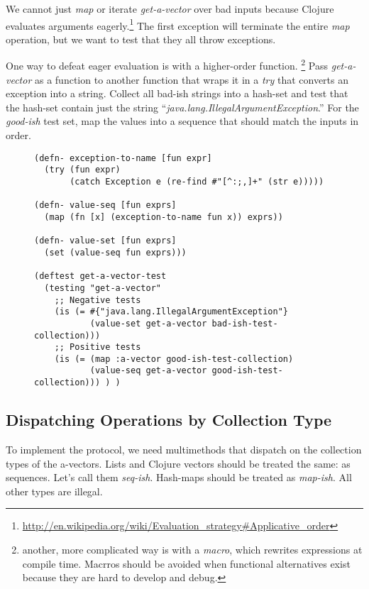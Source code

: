 \documentclass[11pt]{article}
\begin{document}
We cannot just \emph{map} or iterate \emph{get-a-vector} over bad inputs
because Clojure evaluates arguments
eagerly.\footnote{\url{http://en.wikipedia.org/wiki/Evaluation_strategy#Applicative_order}}
The first exception will terminate the entire \emph{map} operation, but we
want to test that they all throw exceptions.

One way to defeat eager evaluation is with a higher-order function.
\footnote{another, more complicated way is with a \emph{macro}, which rewrites
   expressions at compile time. Macrros should be avoided when
   functional alternatives exist because they are hard to develop and
   debug.}  Pass \emph{get-a-vector} as a function to another function that
wraps it in a \emph{try} that converts an exception into a string.
Collect all bad-ish strings into a hash-set and test that the
hash-set contain just the string
``\emph{java.lang.IllegalArgumentException}.'' For the \emph{good-ish}
test set, map the values into a sequence that should match the inputs
in order.

\begin{figure}[H]
\label{get-a-vector-test}
\begin{verbatim}
(defn- exception-to-name [fun expr]
  (try (fun expr)
       (catch Exception e (re-find #"[^:;,]+" (str e)))))

(defn- value-seq [fun exprs]
  (map (fn [x] (exception-to-name fun x)) exprs))

(defn- value-set [fun exprs]
  (set (value-seq fun exprs)))

(deftest get-a-vector-test
  (testing "get-a-vector"
    ;; Negative tests
    (is (= #{"java.lang.IllegalArgumentException"}
           (value-set get-a-vector bad-ish-test-collection)))
    ;; Positive tests
    (is (= (map :a-vector good-ish-test-collection)
           (value-seq get-a-vector good-ish-test-collection))) ) )
\end{verbatim}
\end{figure}
\subsection{Dispatching Operations by Collection Type}
\label{sec-4-5}

To implement the protocol, we need multimethods that dispatch on the
collection types of the a-vectors. Lists and Clojure vectors should
be treated the same: as sequences. Let's call them
\emph{seq-ish}. Hash-maps should be treated as \emph{map-ish}. All other types
are illegal.
\end{document}
